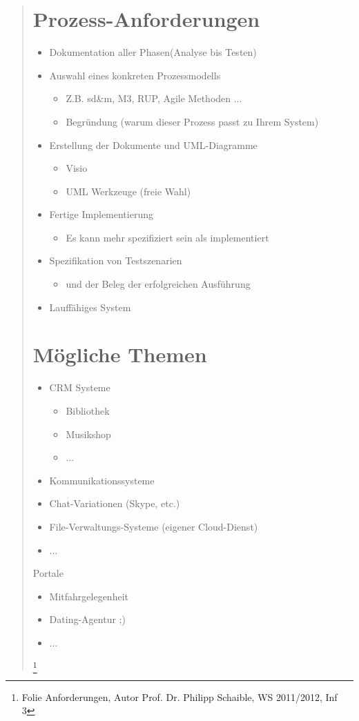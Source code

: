 \begin{quote}
    \section{Prozess-Anforderungen}
    \begin{itemize}
        \item Dokumentation aller Phasen(Analyse bis Testen)
        \item Auswahl eines konkreten Prozessmodells
        \begin{itemize}
	    \item Z.B. sd\&m, M3, RUP, Agile Methoden ...
	    \item Begründung (warum dieser Prozess passt zu Ihrem System)
        \end{itemize}
        \item Erstellung der Dokumente und UML-Diagramme
        \begin{itemize}
	    \item Visio
	    \item UML Werkzeuge (freie Wahl)
        \end{itemize}
        \item Fertige Implementierung 
        \begin{itemize}
	    \item Es kann mehr spezifiziert sein als implementiert
        \end{itemize}
        \item Spezifikation von Testszenarien
        \begin{itemize}
	    \item und der Beleg der erfolgreichen Ausführung
        \end{itemize}
        \item Lauffähiges System
    \end{itemize}
    \section{Mögliche Themen}
    \begin{itemize}
        \item CRM Systeme
        \begin{itemize}
	    \item Bibliothek
	    \item Musikshop
	    \item ...
        \end{itemize}
        \item Kommunikationssysteme
	\item Chat-Variationen (Skype, etc.)
	\item File-Verwaltungs-Systeme (eigener Cloud-Dienst)
	\item ...
    \end{itemize}
    \item Portale
    \begin{itemize}
	\item Mitfahrgelegenheit
	\item Dating-Agentur ;)
	\item ...
    \end{itemize}
\footnote{Folie Anforderungen, Autor Prof. Dr. Philipp Schaible, WS 2011/2012, Inf 3}
\end{quote}
